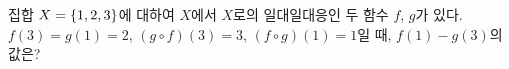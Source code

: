 집합 $X=\{1{,}\mkern3mu\mathopen{}2{,}\mkern3mu\mathopen{}3\}$에 대하여 $X$에서 $X$로의 일대일대응인 두 함수 $f$, $g$가 있다. $f(3)=g(1)=2$, $(g\circ f)(3)=3$, $(f\circ g)(1)=1$일 때, $f(1)-g(3)$의 값은?
